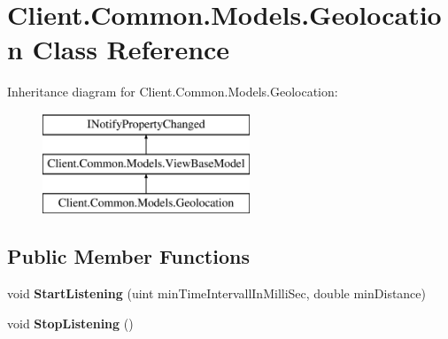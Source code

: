 \hypertarget{classClient_1_1Common_1_1Models_1_1Geolocation}{\section{Client.\-Common.\-Models.\-Geolocation Class Reference}
\label{classClient_1_1Common_1_1Models_1_1Geolocation}
}
Inheritance diagram for Client.\-Common.\-Models.\-Geolocation\-:\begin{figure}[H]
\begin{center}
\leavevmode
\includegraphics[height=3.000000cm]{classClient_1_1Common_1_1Models_1_1Geolocation}
\end{center}
\end{figure}
\subsection*{Public Member Functions}
\begin{DoxyCompactItemize}
\item 
\hypertarget{classClient_1_1Common_1_1Models_1_1Geolocation_aed14d4e1cc101de935133d0fae3ef349}{void {\bfseries Start\-Listening} (uint min\-Time\-Intervall\-In\-Milli\-Sec, double min\-Distance)}\label{classClient_1_1Common_1_1Models_1_1Geolocation_aed14d4e1cc101de935133d0fae3ef349}

\item 
\hypertarget{classClient_1_1Common_1_1Models_1_1Geolocation_a6b6da0803d978de553791129b51954e9}{void {\bfseries Stop\-Listening} ()}\label{classClient_1_1Common_1_1Models_1_1Geolocation_a6b6da0803d978de553791129b51954e9}

\end{DoxyCompactItemize}
